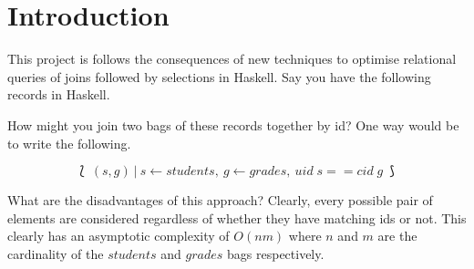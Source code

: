 \chapter{Introduction}
\begin{comment}
The introduction should summarise the subject area, the specific problem you are addressing, including key ideas for their solution, together with a summary of the project's main contributions. When detailing the contributions it is helpful to provide forward references to the section(s) of the report that provide the relevant technical details. The introduction should be aimed at an informed, but otherwise non-expert, reader. A good tip is to assume that all your assessors will read the abstract and introduction, whereas the more detailed technical sections may only be read by your first and second markers - it's therefore really important to get it right.
\end{comment}

This project is follows the consequences of new techniques to optimise
relational queries of joins followed by selections in Haskell. Say you have the
following records in Haskell.



\noindent
How might you join two bags of these records together by id? One way would be to
write the following.

\[\lbag\:(s, g)\:|\:s \leftarrow students,\:g \leftarrow grades,\:uid\;s == cid\;g
\:\rbag\]

What are the disadvantages of this approach? Clearly, every possible pair of
elements are considered regardless of whether they have matching ids or not.
This clearly has an asymptotic complexity of $O(nm)$ where $n$ and $m$ are the
cardinality of the $students$ and $grades$ bags respectively.
